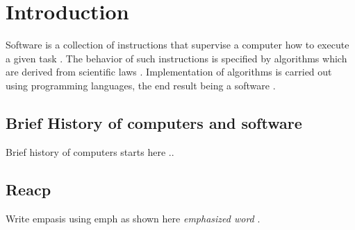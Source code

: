 \chapter{Introduction}
\label{ch:intro}
Software is a collection of instructions that supervise a computer how to execute a given task \citep{enwiki:1056292826}. The behavior of such instructions is specified by algorithms which are derived from scientific laws \citep{wolfram1984computer}.  Implementation of algorithms is carried out using programming languages, the end result being a software \citep{enwiki:1055624679, enwiki:1055665216}. 


\section{Brief History of computers and software}

Brief history of computers starts here ..
%
%
\section{Reacp}
\label{sec:intro:reacp}
{}
Write empasis using emph as shown here \emph{emphasized word} .


